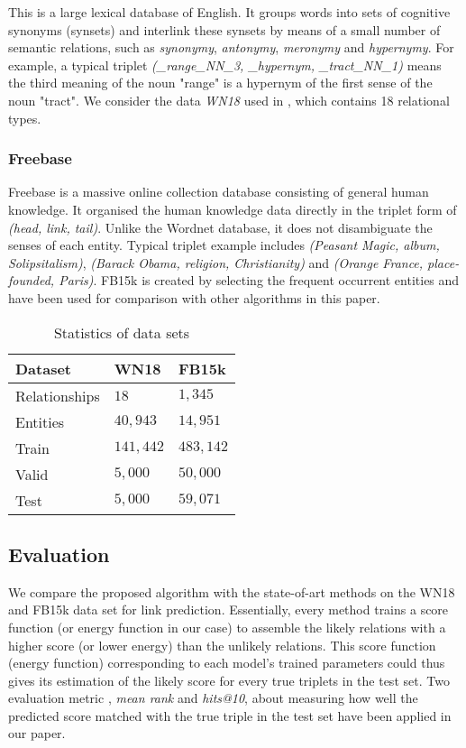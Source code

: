 \documentclass[9pt]{sig-alternate-05-2015}
\begin{document}
This is a large lexical database of English. It groups words into sets of cognitive synonyms (synsets) and interlink these synsets by means of a small number of semantic relations, such as \emph{synonymy}, \emph{antonymy}, \emph{meronymy} and \emph{hypernymy}.  For example, a typical triplet \emph{(\_range\_NN\_3, \_hypernym, \_tract\_NN\_1)} means the third meaning of the noun "range"  is a hypernym of the first sense of the noun "tract". We consider the data \emph{WN18} used in \cite{bordes_semantic_2014}, which contains 18 relational types.

\subsubsection{Freebase} 
Freebase is a massive online collection database consisting of general human knowledge. It organised the human knowledge data  directly in the triplet form of \emph{(head, link, tail)}. Unlike the Wordnet database, it does not disambiguate the senses of each entity. Typical triplet example includes \emph{(Peasant Magic, album, Solipsitalism)}, \emph{(Barack Obama, religion, Christianity)} and \emph{(Orange France, place-founded, Paris)}. FB15k \cite{bordes_learning_2011} is created by selecting the frequent occurrent entities and have been used for comparison with other algorithms in this paper.

\begin{table}[t]
\caption{Statistics of data sets} \label{data}
\centering
\begin{tabular}[center]{|l |l l |} 
 \hline
Dataset & WN18 & FB15k \\
 \hline 
Relationships & $18$ & $1,345$ \\
Entities & $40,943$ & $14,951$ \\
Train & $141,442$ & $483,142$ \\
Valid & $5,000$ & $50,000$ \\
Test & $5,000$ & $59,071$ \\
\hline
 \end{tabular}
 \end{table}
 
\subsection{Evaluation}
We compare the proposed algorithm with the state-of-art  methods on the WN18 and FB15k data set for link prediction. Essentially, every method trains a score function (or energy function in our case) to assemble the likely relations with a higher score (or lower energy) than the unlikely relations. This score function (energy function) corresponding to each model's trained parameters could thus gives its estimation of the likely score for every true triplets in the test set. Two evaluation metric \cite{bordes_learning_2011}, \emph{mean rank} and \emph{hits@10}, about measuring how well the predicted score matched with the true triple in the test set have been applied in our paper.
\end{document}
